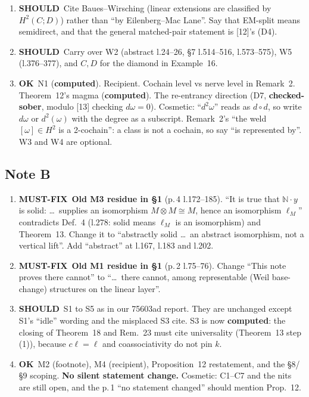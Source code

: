 \documentclass[11pt]{article}
\newcommand{\Z}{\mathbb{Z}}
\newcommand{\N}{\mathbb{N}}
\newcommand{\F}{\mathbb{F}}
\newcommand{\MF}{\textbf{MUST-FIX}}
\newcommand{\SH}{\textbf{SHOULD}}
\newcommand{\OK}{\textbf{OK}}
\begin{document}
\begin{enumerate}[label=\textbf{A\arabic*},leftmargin=*]
level 3, and the $\F_2$ detector has nerve level 2 (\textbf{computed}). So l.363--364, ``which nerve
level always does [have a coefficient-free answer]: $N_2$'', is false as defined, and so is the \S7
reliance (l.542, ``nerve level is coefficient-free''). The coefficient-free object is the level of the
\emph{datum} $a\cdot a=1$, a raw datum on $N_2$. Say: ``the datum sits at nerve level 2 for every
coefficient ring; the detecting \emph{class} sits at nerve level 2 over $\F_2$ and 3 over $\Z$''. Fix
W1 in the same edit.
\item \SH\ Cite Baues--Wirsching (linear extensions are classified by $H^2(C;D)$) rather than ``by
Eilenberg--Mac Lane''. Say that EM-split means semidirect, and that the general matched-pair statement
is [12]'s (D4).
\item \SH\ Carry over W2 (abstract l.24--26, \S7 l.514--516, l.573--575), W5 (l.376--377), and $C,D$
for the diamond in Example~16.
\item \OK\ N1 (\textbf{computed}). Recipient. Cochain level vs nerve level in Remark~2. Theorem~12's
magma (\textbf{computed}). The re-entrancy direction (D7, \textbf{checked-sober}, modulo [13]
checking $d\omega=0$). Cosmetic: ``$d^2\omega$'' reads as $d\circ d$, so write $d\omega$ or $d^2(\omega)$
with the degree as a subscript. Remark~2's ``the weld $[\omega]\in H^2$ is a 2-cochain'': a class is
not a cochain, so say ``is represented by''. W3 and W4 are optional.
\end{enumerate}

\subsection*{Note B}
\begin{enumerate}[label=\textbf{B\arabic*},leftmargin=*]
\item \MF\ \textbf{Old M3 residue in \S1} (p.\,4 l.172--185). ``It is true that $\N\cdot y$ is solid:
\dots\ supplies an isomorphism $M\otimes M\cong M$, hence an isomorphism $\ell_M$'' contradicts
Def.~4 (l.278: solid means $\ell_M$ is an isomorphism) and Theorem~13. Change it to ``abstractly
solid \dots\ an abstract isomorphism, not a vertical lift''. Add ``abstract'' at l.167, l.183 and
l.202.
\item \MF\ \textbf{Old M1 residue in \S1} (p.\,2 l.75--76). Change ``This note proves there cannot''
to ``\dots\ there cannot, among representable (Weil base-change) structures on the linear layer''.
\item \SH\ S1 to S5 as in our 75603ad report. They are unchanged except S1's ``idle'' wording and the
misplaced S3 cite. S3 is now \textbf{computed}: the closing of Theorem~18 and Rem.~23 must cite
universality (Theorem~13 step (1)), because $c\ell=\ell$ and coassociativity do not pin $k$.
\item \OK\ M2 (footnote), M4 (recipient), Proposition~12 restatement, and the \S8/\S9 scoping.
\textbf{No silent statement change.} Cosmetic: C1--C7 and the nits are still open, and the p.\,1
``no statement changed'' should mention Prop.~12.
\end{enumerate}
\end{document}
